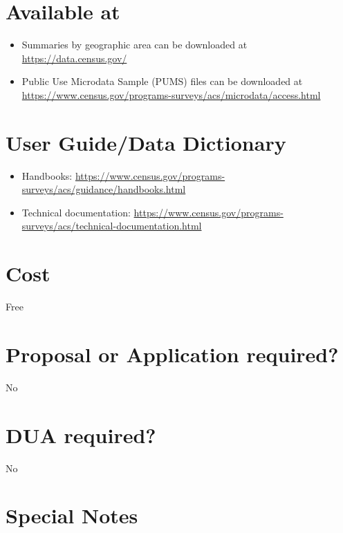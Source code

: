\documentclass[
]{book}
\providecommand{\tightlist}{%
  \setlength{\itemsep}{0pt}\setlength{\parskip}{0pt}}
\begin{document}
\hypertarget{available-at-4}{%
\section{Available at}\label{available-at-4}}

\begin{itemize}
\tightlist
\item
  Summaries by geographic area can be downloaded at \url{https://data.census.gov/}
\item
  Public Use Microdata Sample (PUMS) files can be downloaded at \url{https://www.census.gov/programs-surveys/acs/microdata/access.html}
\end{itemize}

\hypertarget{user-guidedata-dictionary-4}{%
\section{User Guide/Data Dictionary}\label{user-guidedata-dictionary-4}}

\begin{itemize}
\tightlist
\item
  Handbooks: \url{https://www.census.gov/programs-surveys/acs/guidance/handbooks.html}
\item
  Technical documentation: \url{https://www.census.gov/programs-surveys/acs/technical-documentation.html}
\end{itemize}

\hypertarget{cost-4}{%
\section{Cost}\label{cost-4}}

Free

\hypertarget{proposal-or-application-required-4}{%
\section{Proposal or Application required?}\label{proposal-or-application-required-4}}

No

\hypertarget{dua-required-4}{%
\section{DUA required?}\label{dua-required-4}}

No

\hypertarget{special-notes-4}{%
\section{Special Notes}\label{special-notes-4}}
\end{document}
